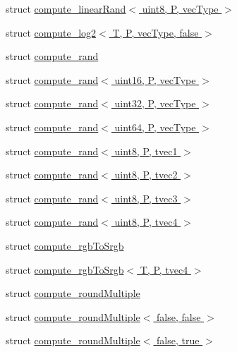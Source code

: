 \begin{DoxyCompactItemize}
\item 
struct \hyperlink{structglm_1_1detail_1_1compute__linear_rand_3_01uint8_00_01_p_00_01vec_type_01_4}{compute\+\_\+linear\+Rand$<$ uint8, P, vec\+Type $>$}
\item 
struct \hyperlink{structglm_1_1detail_1_1compute__log2_3_01_t_00_01_p_00_01vec_type_00_01false_01_4}{compute\+\_\+log2$<$ T, P, vec\+Type, false $>$}
\item 
struct \hyperlink{structglm_1_1detail_1_1compute__rand}{compute\+\_\+rand}
\item 
struct \hyperlink{structglm_1_1detail_1_1compute__rand_3_01uint16_00_01_p_00_01vec_type_01_4}{compute\+\_\+rand$<$ uint16, P, vec\+Type $>$}
\item 
struct \hyperlink{structglm_1_1detail_1_1compute__rand_3_01uint32_00_01_p_00_01vec_type_01_4}{compute\+\_\+rand$<$ uint32, P, vec\+Type $>$}
\item 
struct \hyperlink{structglm_1_1detail_1_1compute__rand_3_01uint64_00_01_p_00_01vec_type_01_4}{compute\+\_\+rand$<$ uint64, P, vec\+Type $>$}
\item 
struct \hyperlink{structglm_1_1detail_1_1compute__rand_3_01uint8_00_01_p_00_01tvec1_01_4}{compute\+\_\+rand$<$ uint8, P, tvec1 $>$}
\item 
struct \hyperlink{structglm_1_1detail_1_1compute__rand_3_01uint8_00_01_p_00_01tvec2_01_4}{compute\+\_\+rand$<$ uint8, P, tvec2 $>$}
\item 
struct \hyperlink{structglm_1_1detail_1_1compute__rand_3_01uint8_00_01_p_00_01tvec3_01_4}{compute\+\_\+rand$<$ uint8, P, tvec3 $>$}
\item 
struct \hyperlink{structglm_1_1detail_1_1compute__rand_3_01uint8_00_01_p_00_01tvec4_01_4}{compute\+\_\+rand$<$ uint8, P, tvec4 $>$}
\item 
struct \hyperlink{structglm_1_1detail_1_1compute__rgb_to_srgb}{compute\+\_\+rgb\+To\+Srgb}
\item 
struct \hyperlink{structglm_1_1detail_1_1compute__rgb_to_srgb_3_01_t_00_01_p_00_01tvec4_01_4}{compute\+\_\+rgb\+To\+Srgb$<$ T, P, tvec4 $>$}
\item 
struct \hyperlink{structglm_1_1detail_1_1compute__round_multiple}{compute\+\_\+round\+Multiple}
\item 
struct \hyperlink{structglm_1_1detail_1_1compute__round_multiple_3_01false_00_01false_01_4}{compute\+\_\+round\+Multiple$<$ false, false $>$}
\item 
struct \hyperlink{structglm_1_1detail_1_1compute__round_multiple_3_01false_00_01true_01_4}{compute\+\_\+round\+Multiple$<$ false, true $>$}

\end{DoxyCompactItemize}
